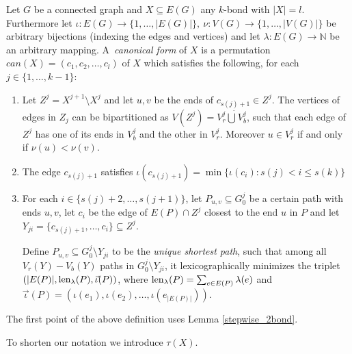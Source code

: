 \begin{defn}
	\label{can}
	Let $G$ be a connected graph and $X \subseteq E(G)$ any $k$-bond with $\lvert X \rvert = l$. Furthermore let \break
	$\iota : E(G) \rightarrow \{1,\ldots,\lvert E(G) \rvert\}, \> \nu : V(G) \rightarrow \{1,\ldots,\lvert V(G) \rvert\}$ be arbitrary bijections (indexing the edges and vertices) and let $\lambda : E(G) \rightarrow \mathbb{N}$ be an arbitrary mapping. A~\textit{canonical form} of $X$ is a permutation $can(X) = (c_1, c_2,\ldots, c_l)$ of $X$ which satisfies the following, for each $j \in \{1,\ldots,k-1\}$:

	\begin{enumerate}[label=\alph*.]
		\item Let $Z^j = X^{j+1} \setminus X^{j}$ and let $u,v$ be the ends of $c_{s(j)+1} \in Z^j$. The vertices of edges in $Z_j$ can be bipartitioned as $V(Z^j) = V^j_r \dot\bigcup V^j_b$, such that each edge of $Z^j$ has one of its ends in $V_b^j$ and the other in $V_r^j$. Moreover $u \in V_r^j$ if and only if $\nu(u) < \nu(v)$.

		\item The edge $c_{s(j)+1}$ satisfies ${\iota(c_{s(j)+1}) = \min\{ \iota(c_i) : s(j) < i \leq s(k) \}}$

	\item For each $i \in \{s(j) + 2,\ldots, s(j+1)\}$,
		let $P_{u,v} \subseteq G^j_0$ be a certain path with ends $u,v$,
		let $c_i$ be the edge of $E(P) \cap Z^j$ closest to the end $u$ in $P$ and let
		$Y_{ji} = \{c_{s(j)+1}, \ldots, c_i\} \subseteq Z^j$.

		Define $P_{u,v} \subseteq G_0^j \setminus Y_{ji}$ to be the \textit{unique shortest path}, such that among all $V_r(Y){-}V_b(Y)$ paths in $G^j_0 \setminus Y_{ji}$, it lexicographically minimizes the triplet
	$(\lvert E(P) \rvert, \operatorname{len}_\lambda(P), \vec{\iota}(P) )$, where $\operatorname{len}_\lambda(P) = \sum_{e \in E(P)} \lambda(e)$ and $\vec{\iota}(P) = (\iota(e_1), \iota(e_2),\ldots, \iota(e_{\lvert E(P) \rvert}))$.

	\end{enumerate}

\end{defn}


\noindent
\begin{note}
The first point of the above definition uses Lemma \ref{stepwise_2bond}.
\end{note}

\clearpage
\noindent
To shorten our notation we introduce $\tau(X)$.

